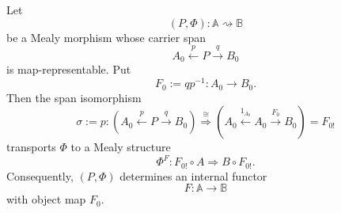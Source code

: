 \begin{corollary}
\label{cor:map-representable-mealy-internal-functor-up-to-iso}
    Let
    \[
        (P,\Phi):\mathbb A\rightsquigarrow\mathbb B
    \]
    be a Mealy morphism whose carrier span
    \[
        A_0\xleftarrow{p}P\xrightarrow{q}B_0
    \]
    is map-representable. Put
    \[
        F_0:=q p^{-1}:A_0\to B_0.
    \]
    Then the span isomorphism
    \[
        \sigma:=p:
        \left(
            A_0\xleftarrow{p}P\xrightarrow{q}B_0
        \right)
        \overset{\cong}{\Longrightarrow}
        \left(
            A_0\xleftarrow{1_{A_0}}A_0\xrightarrow{F_0}B_0
        \right)
        =
        F_{0!}
    \]
    transports \(\Phi\) to a Mealy structure
    \[
        \Phi^F:F_{0!}\circ A\Rightarrow B\circ F_{0!}.
    \]
    Consequently, \((P,\Phi)\) determines an internal functor
    \[
        F:\mathbb A\to\mathbb B
    \]
    with object map \(F_0\).
\end{corollary}
